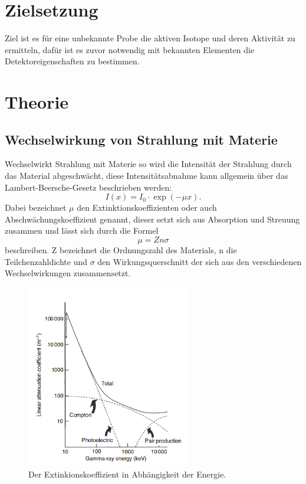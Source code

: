 \section{Zielsetzung}
Ziel ist es für eine unbekannte Probe die aktiven Isotope und deren Aktivität zu ermitteln,
dafür ist es zuvor notwendig mit bekannten Elementen die Detektoreigenschaften
zu bestimmen.

\section{Theorie}
\subsection{Wechselwirkung von Strahlung mit Materie}
Wechselwirkt Strahlung mit Materie so wird die Intensität der Strahlung durch das Material
abgeschwächt, diese Intensitätsabnahme kann allgemein über das Lambert-Beersche-Gesetz beschrieben werden:
\begin{equation}
  I(x)=I_0\cdot\exp(-\mu x).
  \label{eqn:lambert}
\end{equation}
Dabei bezeichnet $\mu$ den Extinktionskoeffizienten oder auch Abschwächungskoeffizient genannt, dieser
setzt sich aus Absorption und Streuung zusammen und lässt sich durch die Formel
\begin{equation}
  \mu=Zn\sigma
\end{equation}
beschreiben. Z bezeichnet die Ordnungszahl des Materials, n die Teilchenzahldichte und $\sigma$ den
Wirkungsquerschnitt der sich aus den verschiedenen Wechselwirkungen zusammensetzt.
\begin{figure}[H]
  \centering
  \includegraphics[height=8cm]{Extin.png}
  \caption{Der Extinkionskoeffizient in Abhängigkeit der Energie. \cite{Gilmore2}}
  \label{fig:Extin}
\end{figure}
